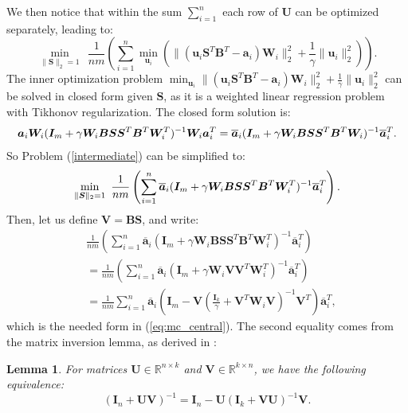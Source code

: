 \documentclass[twoside,11pt]{article}
\newcommand{\md}[1]{\mathbb{#1}}
\newtheorem{lem}{Lemma}
\begin{document}
	We then notice that within the sum $\sum_{i=1}^n$  each row of $\bm{U}$ can be optimized separately, leading to:
	\begin{equation}
	\min_{\|\bm{S}\|_2=1} ~\ \frac{1}{nm}\left( \sum_{i=1}^n \min_{\bm{u}_i}\left(\|(\bm{u}_i\bm{S}^T\bm{B}^T-\bm{a}_i)\bm{W}_i\|_2^2 + \frac{1}{\gamma}\|\bm{u}_i\|_2^2\right) \right).\label{intermediate}
	\end{equation}
	The inner optimization problem $\displaystyle \min_{\bm{u}_i}\|(\bm{u}_i\bm{S}^T\bm{B}^T-\bm{a}_i)\bm{W}_i\|_2^2 + \frac{1}{\gamma}\|\bm{u}_i\|_2^2$ can be solved in closed form given $\bm{S}$, as it is a weighted linear regression problem with Tikhonov regularization. The closed form solution is:
	\begin{equation}
	\bm{a}_i\bm{W}_i(\bm{I}_m+\gamma \bm{W}_i\bm{B}\bm{S}\bm{S}^T\bm{B}^T\bm{W}_i^T)^{-1}\bm{W}_i\bm{a}_i^T= \overline{\bm{a}}_i(\bm{I}_m+\gamma \bm{W}_i\bm{B}\bm{S}\bm{S}^T\bm{B}^T\bm{W}_i)^{-1}\overline{\bm{a}}_i^T\notag  .
	\end{equation}
	So Problem (\ref{intermediate}) can be simplified to:
	$$
	\min_{\|\bm{S}\|_2=1} ~ \frac{1}{nm}\left( \sum_{i=1}^n \overline{\bm{a}}_i(\bm{I}_m+\gamma \bm{W}_i\bm{B}\bm{S}\bm{S}^T\bm{B}^T\bm{W}_i^T)^{-1}\overline{\bm{a}}_i^T \right) \notag .
	$$
	Then, let us define $\bm{V}=\bm{B}\bm{S}$, and write:
	\begin{align*}
	    &\frac{1}{nm}\left( \sum_{i=1}^n \overline{\bm{a}}_i(\bm{I}_m+\gamma \bm{W}_i\bm{B}\bm{S}\bm{S}^T\bm{B}^T\bm{W}_i^T)^{-1}\overline{\bm{a}}_i^T \right)\\& = \frac{1}{nm}\left( \sum_{i=1}^n \overline{\bm{a}}_i(\bm{I}_m+\gamma \bm{W}_i\bm{V}\bm{V}^T\bm{W}_i^T)^{-1}\overline{\bm{a}}_i^T \right)\\&=\frac{1}{nm} \sum_{i=1}^n \overline{\bm{a}}_i
	\left(\bm{I}_m-\bm{V}\left(\frac{\bm{I}_k}{\gamma}+\bm{V}^T\bm{W}_i\bm{V}\right)^{-1}\bm{V}^T\right)\overline{\bm{a}}_i^T,
	\end{align*}
	which is the needed form in (\ref{eq:mc_central}). The second equality comes from the matrix inversion lemma, as derived in \cite{woodbury1950inverting}:
	\begin{lem}
	For matrices $\bm{U} \in \md{R}^{n\times k}$ and $\bm{V} \in \md{R}^{k\times n}$, we have the following equivalence:
	\[(\bm{I}_n+\bm{U}\bm{V})^{-1}=\bm{I}_n-\bm{U}(\bm{I}_k+\bm{V}\bm{U})^{-1}\bm{V}.\]
	\end{lem}
\endproof
\end{document}
